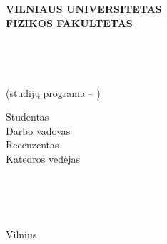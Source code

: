 \begin{titlepage}

\begin{center}



\MakeUppercase{\normalsize \textbf{Vilniaus universitetas}}\\
\MakeUppercase{\normalsize \textbf{Fizikos fakultetas}}\\
\MakeUppercase{\normalsize \textbf{\katedra}}\\[180pt]
\normalsize \studentas \\ [24pt]


\MakeUppercase{{ \normalsize \pavadinimas}}\\[24pt]

\normalsize \darbas \\ [24pt]
(studij\k{u} programa -- \MakeUppercase{\normalsize \studprog)}\\ [130pt]

\linespread{1.3}
\begin{minipage}{0.7\textwidth}
\begin{flushleft} \normalsize

Studentas \\  %
Darbo vadovas \\ %
Recenzentas\\ %
Katedros ved\.{e}jas %
\end{flushleft}
\end{minipage}
\begin{minipage}{0.29\textwidth}
\begin{flushleft} \normalsize
\studentas \\
\vadovas \\
\recenzentas \\
\vedejas
\end{flushleft}
\end{minipage}

\vfill

{\normalsize Vilnius \the\year}

\end{center}

\end{titlepage} 